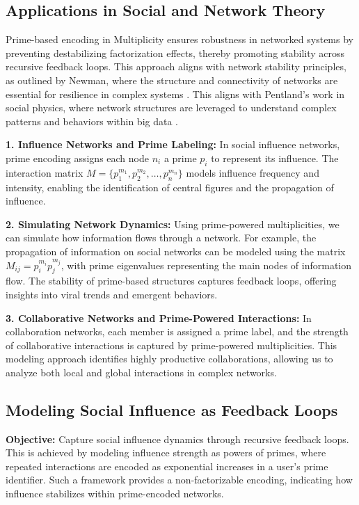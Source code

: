 \documentclass{article}
\begin{document}
\subsection{Applications in Social and Network Theory}
Prime-based encoding in Multiplicity ensures robustness in networked systems by preventing destabilizing factorization effects, thereby promoting stability across recursive feedback loops. This approach aligns with network stability principles, as outlined by Newman, where the structure and connectivity of networks are essential for resilience in complex systems \cite{newman2018}. This aligns with Pentland's work in social physics, where network structures are leveraged to understand complex patterns and behaviors within big data \cite{pentland2014}.

\textbf{1. Influence Networks and Prime Labeling:} In social influence networks, prime encoding assigns each node \( n_i \) a prime \( p_i \) to represent its influence. The interaction matrix \( M = \{ p_1^{m_1}, p_2^{m_2}, \ldots, p_n^{m_n} \} \) models influence frequency and intensity, enabling the identification of central figures and the propagation of influence.

\textbf{2. Simulating Network Dynamics:} Using prime-powered multiplicities, we can simulate how information flows through a network. For example, the propagation of information on social networks can be modeled using the matrix \( M_{ij} = p_i^{m_i} p_j^{m_j} \), with prime eigenvalues representing the main nodes of information flow. The stability of prime-based structures captures feedback loops, offering insights into viral trends and emergent behaviors.

\textbf{3. Collaborative Networks and Prime-Powered Interactions:} In collaboration networks, each member is assigned a prime label, and the strength of collaborative interactions is captured by prime-powered multiplicities. This modeling approach identifies highly productive collaborations, allowing us to analyze both local and global interactions in complex networks.

\subsection{Modeling Social Influence as Feedback Loops}

\textbf{Objective:} Capture social influence dynamics through recursive feedback loops. This is achieved by modeling influence strength as powers of primes, where repeated interactions are encoded as exponential increases in a user’s prime identifier. Such a framework provides a non-factorizable encoding, indicating how influence stabilizes within prime-encoded networks.
\end{document}
